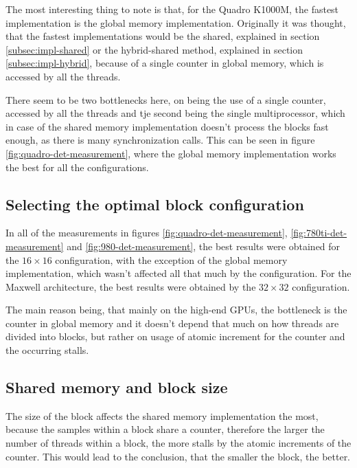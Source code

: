 The most interesting thing to note is that, for the Quadro K1000M, the fastest implementation is the global memory implementation. Originally it was thought, that the fastest implementations would be the shared, explained in section \ref{subsec:impl-shared} or the hybrid-shared method, explained in section \ref{subsec:impl-hybrid}, because of a single counter in global memory, which is accessed by all the threads.

There seem to be two bottlenecks here, on being the use of a single counter, accessed by all the threads and tje second being the single multiprocessor, which in case of the shared memory implementation doesn't process the blocks fast enough, as there is many synchronization calls. This can be seen in figure \ref{fig:quadro-det-measurement}, where the global memory implementation works the best for all the configurations.

\subsection{Selecting the optimal block configuration}\label{subsec:block-config}

In all of the measurements in figures \ref{fig:quadro-det-measurement}, \ref{fig:780ti-det-measurement} and \ref{fig:980-det-measurement}, the best results were obtained for the $16 \times 16$ configuration, with the exception of the global memory implementation, which wasn't affected all that much by the configuration. For the Maxwell architecture, the best results were obtained by the $32 \times 32$ configuration.

The main reason being, that mainly on the high-end GPUs, the bottleneck is the counter in global memory and it doesn't depend that much on how threads are divided into blocks, but rather on usage of atomic increment for the counter and the occurring stalls.

\subsection{Shared memory and block size}

The size of the block affects the shared memory implementation the most, because the samples within a block share a counter, therefore the larger the number of threads within a block, the more stalls by the atomic increments of the counter. This would lead to the conclusion, that the smaller the block, the better.

